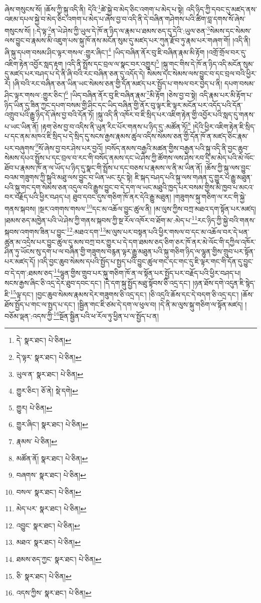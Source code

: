 ཞེས་གསུངས་སོ། །ཆོས་ཀྱི་སྐུ་འདི་ནི། དེའི་\footnote{དེ་  སྣར་ཐང་།  པེ་ཅིན། }ཚེ་སྐྱེ་བ་མེད་ཅིང་འགག་པ་མེད་པ་སྟེ། འདི་ཉིད་ཀྱི་དབང་དུ་མཛད་ནས་འཇམ་དཔལ་སྐྱེ་བ་མེད་ཅིང་འགག་པ་མེད་པ་ཞེས་བྱ་བ་འདི་ནི་དེ་བཞིན་གཤེགས་པའི་ཚིག་བླ་དགས་སོ་ཞེས་གསུངས་སོ། །:དེ་ལྟ་\footnote{དེ་ལྟར་  སྣར་ཐང་།  པེ་ཅིན། }ན་ཡེ་ཤེས་ཀྱི་ཡུལ་དེ་ཁོ་ན་ཉིད་ལ་རྣམ་པ་ཐམས་ཅད་དུ་དེའི་:ཡུལ་ཅན་\footnote{ཡུལ་ན་  སྣར་ཐང་།  པེ་ཅིན། }སེམས་དང་སེམས་ལས་བྱུང་བ་རྣམས་མི་འཇུག་པས་སྐུ་ཁོ་ནས་མངོན་སུམ་དུ་མཛད་པར་ཀུན་རྫོབ་ཏུ་རྣམ་པར་གཞག་གོ། །འདི་ནི། ཞི་སྐུ་དཔག་བསམ་ཤིང་ལྟར་གསལ་:གྱུར་ཞིང་།\footnote{གྱུར་ཅིང་།  ཅོ་ནེ།  སྡེ་དགེ། } །ཡིད་བཞིན་ནོར་བུ་ཇི་བཞིན་རྣམ་མི་རྟོག །འགྲོ་གྲོལ་བར་དུ་འཇིག་རྟེན་འབྱོར་སླད་རྟག །འདི་ནི་སྤྲོས་དང་བྲལ་ལ་སྣང་བར་འགྱུར།\footnote{གྱུར།  པེ་ཅིན། } །སྐུ་གང་གིས་དེ་ཁོ་ན་ཉིད་འདི་མངོན་སུམ་དུ་མཛད་པར་བཤད་པ་དེ་ནི་ཞི་བའི་རང་བཞིན་ཅན་དུ་འདོད་དེ། སེམས་དང་སེམས་ལས་བྱུང་བ་དང་བྲལ་བའི་ཕྱིར་རོ། །ཞི་བའི་རང་བཞིན་ཅན་ཡིན་ཡང་སེམས་ཅན་གྱི་དོན་མཛད་པར་སྤྱོད་པ་གསལ་བར་བྱེད་པ་ནི། དཔག་བསམ་ཤིང་ལྟར་གསལ་:གྱུར་ཅིང་།\footnote{གྱུར་ཞིང་།  སྣར་ཐང་།  པེ་ཅིན། } །ཡིད་བཞིན་ནོར་བུ་ཇི་བཞིན་རྣམ་\footnote{རྣམས་  པེ་ཅིན། }མི་རྟོག །ཅེས་བྱ་བ་སྟེ། འདི་རྣམ་པར་མི་རྟོག་པ་ཉིད་ཡིན་དུ་ཟིན་ཀྱང་དཔག་བསམ་གྱི་ཤིང་དང་ཡིད་བཞིན་གྱི་ནོར་བུ་ལྟར་ཇི་ལྟར་མངོན་པར་འདོད་པའི་དོན་འགྲུབ་པའི་རྒྱུ་ཉིད་དོ་ཞེས་བྱ་བའི་དོན་ཏོ། །སྐུ་འདི་ནི་འཁོར་བ་ཇི་སྲིད་པར་འཇིག་རྟེན་གྱི་འབྱོར་པའི་སླད་དུ་གནས་པ་ཡང་ཡིན་ནོ། །རྟག་ཅེས་བྱ་བ་འདིས་ནི་ཡུན་རིང་པོར་གནས་པ་ཉིད་དུ་:མཚོན་ཏོ།\footnote{མཚོན་ནོ།  སྣར་ཐང་།  པེ་ཅིན། } །དེའི་ཕྱིར་འཇིག་རྟེན་ཇི་སྲིད་པ་དང་ནམ་མཁའ་ཇི་སྲིད་པ་དེ་སྲིད་དུ་སངས་རྒྱས་རྣམས་ཚུལ་འདིས་སེམས་ཅན་གྱི་དོན་ཁོ་ན་མཛད་ཅིང་རྣམ་པར་བཞུགས་\footnote{བཞགས་  སྣར་ཐང་།  པེ་ཅིན། }སོ་ཞེས་བྱ་བར་ཤེས་པར་བྱའོ། །བསོད་ནམས་བརྒྱའི་མཚན་གྱིས་བརྒྱན་པའི་སྐུ་འདི་ནི་བྱང་ཆུབ་སེམས་དཔའ་སྤྲོས་པ་དང་བྲལ་བ་རང་གི་བསོད་ནམས་དང་ཡེ་ཤེས་ཀྱི་ཚོགས་ལས་ཤེས་རབ་དྲི་མ་མེད་པའི་མེ་ལོང་ཐོབ་པ་རྣམས་ཁོ་ན་ལ་ཡོད་པ་ཉིད་དུ་སྣང་གི་སྤྲོས་པ་དང་བཅས་པ་རྣམས་ལ་ནི་མ་ཡིན་ནོ། །ཆོས་ཀྱི་སྐུ་ལས་བྱུང་བའམ་གཟུགས་ཀྱི་སྐུའི་མཐུ་ལས་བྱུང་བ་ཡིན་ཡང་རུང་སྟེ། ཇི་སྐད་བཤད་པའི་སྐུ་ལས་གཞན་དུ་གྱུར་པ་རྒྱུ་མཐུན་པའི་སྐུ་གང་དག་སེམས་ཅན་འདུལ་བའི་རྒྱུས་བྱུང་བ་དེ་དག་ལ་ཡང་མཐུའི་ཁྱད་པར་བསམ་གྱིས་མི་ཁྱབ་པ་མངའ་བར་བརྗོད་པའི་ཕྱིར་བཤད་པ། ཐུབ་དབང་དུས་གཅིག་ཁོ་ནར་དེའི་རྒྱུ་མཐུན། །གཟུགས་སྐུ་གཅིག་ལ་རང་གི་སྐྱེ་གནས་སྐབས། །སྔར་འགགས་གསལ་\footnote{བསལ་  སྣར་ཐང་།  པེ་ཅིན། }དང་མ་འཆོལ་བྱུང་ཚུལ་ནི། །མ་ལུས་ཀྱིས་བཀྲ་མཐའ་དག་སྟོན་པར་མཛད། །ཐམས་ཅད་མཁྱེན་པའི་ཡེ་ཤེས་ཀྱི་གནས་སྐབས་ཀྱི་སྔ་རོལ་འཁོར་བ་ཐོག་མ་:མེད་པ་\footnote{མེད་པར་  སྣར་ཐང་།  པེ་ཅིན། }རང་ཉིད་ཀྱི་སྐྱེ་བའི་གནས་སྐབས་འགགས་ཟིན་པ་བྱུང་\footnote{འབྱུང་  སྣར་ཐང་།  པེ་ཅིན། }:མཐའ་དག་\footnote{མཐའ་  སྣར་ཐང་།  པེ་ཅིན། }མ་ལུས་པར་བསྟན་པའི་ཕྱིར་གསལ་བ་དང་མ་འཆོལ་བར་དེ་ཕན་ཚུན་མ་འདྲེས་པར་བྱུང་ཚུལ་དུ་མས་བཀྲ་བར་གྱུར་པ་དེ་དག་ཐམས་ཅད་ཅིག་ཅར་ཁོ་ནར་མེ་ལོང་གི་དཀྱིལ་འཁོར་ཤིན་ཏུ་ཡོངས་སུ་དག་པ་ལ་བཞིན་གྱི་གཟུགས་བརྙན་ལྟར་རྒྱུ་མཐུན་པའི་སྐུ་གཅིག་ཉིད་ལ་ལྷུན་གྱིས་གྲུབ་པར་སྟོན་པར་མཛད་དོ། །འདི་བྱང་ཆུབ་སེམས་དཔའི་སྤྱོད་པ་སྤྱད་པའི་བྱུང་ཚུལ་གང་དང་གང་དུ་ཇི་ལྟར་གང་གི་དོན་དུ་བྱུང་བ་དེ་དག་:ཐམས་ཅད་\footnote{ཐམས་ཅད་ཀྱང་  སྣར་ཐང་།  པེ་ཅིན། }ལྷུན་གྱིས་གྲུབ་པར་སྐུ་གཅིག་ཁོ་ན་ལ་སྟོན་པར་སྤྱོད་པར་བརྗོད་པའི་ཕྱིར་བཤད་པ། སངས་རྒྱས་ཞིང་ཅི་འདྲ་དེར་ཐུབ་དབང་དང་། །དེ་དག་སྐུ་སྤྱོད་མཐུ་སྟོབས་ཅི་འདྲ་དང་། །ཉན་ཐོས་དགེ་འདུན་ཇི་སྙེད་ཇི་\footnote{ཅི་  སྣར་ཐང་།  པེ་ཅིན། }ལྟ་དང་། །བྱང་ཆུབ་སེམས་རྣམས་དེར་གཟུགས་ཅི་འདྲ་དང་། །ཅི་འདྲའི་ཆོས་དང་དེ་བདག་ཅི་འདྲ་དང་། །ཆོས་ཐོས་སྤྱོད་པ་གང་ལ་སྤྱད་པ་དང་། །སྦྱིན་གང་ཇི་ཙམ་དེ་དག་ལ་ཕུལ་བ། །དེ་ནི་མ་ལུས་སྐུ་གཅིག་ལ་སྟོན་མཛད། །བཅོམ་ལྡན་:འདས་ཀྱི་\footnote{འདས་ཀྱིས་  སྣར་ཐང་།  པེ་ཅིན། }སྔོན་སྦྱིན་པའི་ཕ་རོལ་ཏུ་ཕྱིན་པ་ལ་སྤྱོད་པ་ན། 